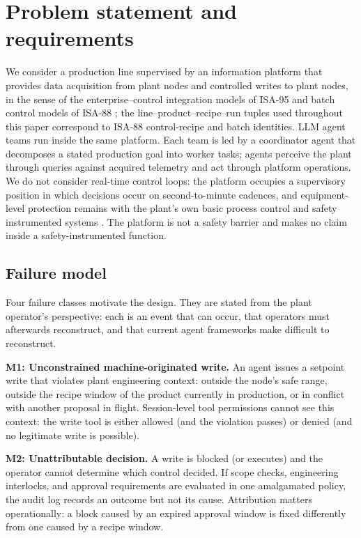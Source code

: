 \section{Problem statement and requirements}
\label{sec:problem}

We consider a production line supervised by an information platform that
provides data acquisition from plant nodes and controlled writes to plant
nodes, in the sense of the enterprise--control integration models of
ISA-95 \cite{isa95_2025} and batch control models of ISA-88
\cite{isa88_2010}; the line--product--recipe--run tuples used throughout
this paper correspond to ISA-88 control-recipe and batch identities. LLM
agent teams run inside the same platform. Each team
is led by a coordinator agent that decomposes a stated production goal into
worker tasks; agents perceive the plant through queries against acquired
telemetry and act through platform operations. We do not consider
real-time control loops: the platform occupies a supervisory position in
which decisions occur on second-to-minute cadences, and equipment-level
protection remains with the plant's own basic process control and safety
instrumented systems \cite{iec61511}. The platform is not a safety
barrier and makes no claim inside a safety-instrumented function.

\subsection{Failure model}
\label{sec:problem-fm}

Four failure classes motivate the design. They are stated from the plant
operator's perspective: each is an event that can occur, that operators must
afterwards reconstruct, and that current agent frameworks make difficult to
reconstruct.

\textbf{M1: Unconstrained machine-originated write.} An agent issues a
setpoint write that violates plant engineering context: outside the
node's safe range, outside the recipe window of the product currently in
production, or in conflict with another proposal in flight. Session-level
tool permissions cannot see this context: the write tool is either allowed
(and the violation passes) or denied (and no legitimate write is possible).

\textbf{M2: Unattributable decision.} A write is blocked (or executes)
and the operator cannot determine which control decided. If scope checks,
engineering interlocks, and approval requirements are evaluated in one
amalgamated policy, the audit log records an outcome but not its cause.
Attribution matters operationally: a block caused by an expired approval
window is fixed differently from one caused by a recipe window.


